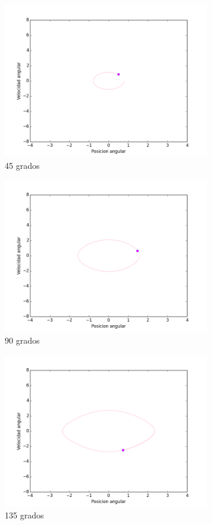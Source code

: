 \documentclass[12pt]{article}
\begin{document}
\begin{figure}[H]
		\centering
	\includegraphics[width=9cm]{45f.png}
	\caption{45 grados}
\end{figure}

\begin{figure}[H]
		\centering
	\includegraphics[width=9cm]{90f.png}
	\caption{90 grados}
\end{figure}

\begin{figure}[H]
		\centering
	\includegraphics[width=9cm]{135f.png}
	\caption{135 grados}
\end{figure}
\end{document}
